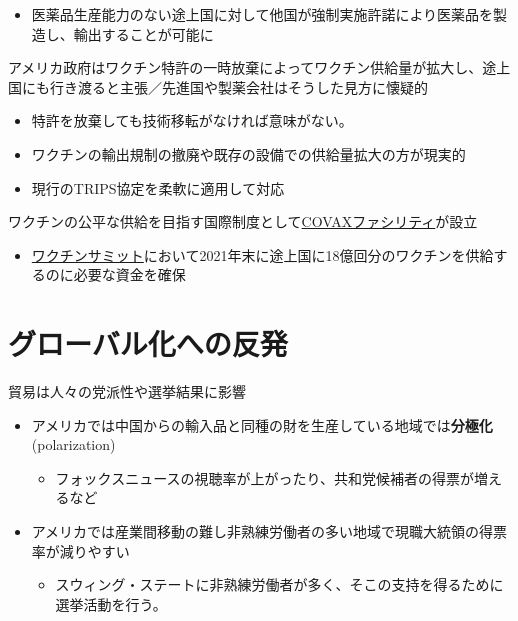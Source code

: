 \documentclass[
  xelatex,
  ja=standard]{bxjsarticle}
\providecommand{\tightlist}{%
  \setlength{\itemsep}{0pt}\setlength{\parskip}{0pt}}\usepackage{longtable,booktabs,array}
\begin{document}
\begin{itemize}
\tightlist
\item
  医薬品生産能力のない途上国に対して他国が強制実施許諾により医薬品を製造し、輸出することが可能に
\end{itemize}

アメリカ政府はワクチン特許の一時放棄によってワクチン供給量が拡大し、途上国にも行き渡ると主張／先進国や製薬会社はそうした見方に懐疑的

\begin{itemize}
\tightlist
\item
  特許を放棄しても技術移転がなければ意味がない。
\item
  ワクチンの輸出規制の撤廃や既存の設備での供給量拡大の方が現実的
\item
  現行のTRIPS協定を柔軟に適用して対応
\end{itemize}

ワクチンの公平な供給を目指す国際制度として\href{https://www.mhlw.go.jp/content/10501000/000672596.pdf}{COVAXファシリティ}が設立

\begin{itemize}
\tightlist
\item
  \href{https://www.mofa.go.jp/mofaj/page1_000979.html}{ワクチンサミット}において2021年末に途上国に18億回分のワクチンを供給するのに必要な資金を確保
\end{itemize}

\hypertarget{ux30b0ux30edux30fcux30d0ux30ebux5316ux3078ux306eux53cdux767a}{%
\section{グローバル化への反発}\label{ux30b0ux30edux30fcux30d0ux30ebux5316ux3078ux306eux53cdux767a}}

貿易は人々の党派性や選挙結果に影響

\begin{itemize}
\tightlist
\item
  アメリカでは中国からの輸入品と同種の財を生産している地域では\textbf{分極化}
  (polarization)\citep{autor2020}

  \begin{itemize}
  \tightlist
  \item
    フォックスニュースの視聴率が上がったり、共和党候補者の得票が増えるなど
  \end{itemize}
\item
  アメリカでは産業間移動の難し非熟練労働者の多い地域で現職大統領の得票率が減りやすい\citep{jensen2017}

  \begin{itemize}
  \tightlist
  \item
    スウィング・ステートに非熟練労働者が多く、そこの支持を得るために選挙活動を行う。
  \end{itemize}
\end{itemize}
\end{document}

